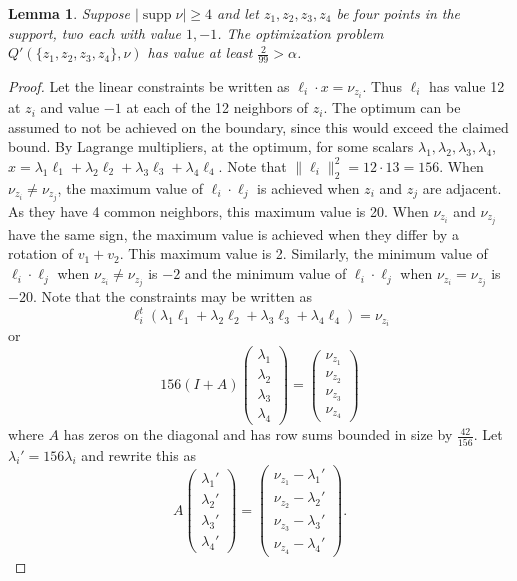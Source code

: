 \documentclass[a4paper, 12pt, notitlepage]{amsart}
\newcommand{\supp}{\operatorname{supp}}
\newtheorem{lemma}[theorem]{Lemma}
\theoremstyle{remark}
\begin{document}
\begin{lemma}
Suppose $|\supp \nu| \geq 4$ and let $z_1, z_2, z_3, z_4$ be four points in the support, two each with value $1, -1$.  The optimization problem $Q'(\{z_1, z_2, z_3, z_4\}, \nu)$ has value at least $\frac{2}{99} > \alpha$.  
 \end{lemma}
 \begin{proof}
Let the linear constraints be written as $\ell_i \cdot x = \nu_{z_i}$. Thus $\ell_i$ has value 12 at $z_i$ and value $-1$ at each of the 12 neighbors of $z_i$.  The optimum can be assumed to  not be achieved on the boundary, since this would exceed the claimed bound. By Lagrange multipliers, at the optimum, for some scalars $\lambda_1, \lambda_2, \lambda_3, \lambda_4$, $x = \lambda_1 \ell_1 + \lambda_2 \ell_2 +\lambda_3 \ell_3 + \lambda_4 \ell_4$.  Note that $\|\ell_i\|_2^2 = 12\cdot 13 = 156$.  When $\nu_{z_i} \neq \nu_{z_j}$, the maximum value of $\ell_i \cdot \ell_j$ is achieved when $z_i$ and $z_j$ are adjacent.  As they have 4 common neighbors, this maximum value is 20.  When $\nu_{z_i}$ and $\nu_{z_j}$ have the same sign, the maximum value is achieved when they differ by a rotation of $v_1 + v_2$. This maximum value is 2. Similarly, the minimum value of $\ell_i \cdot \ell_j$ when $\nu_{z_i} \neq \nu_{z_j}$ is $-2$ and the minimum value of $\ell_i \cdot \ell_j$ when $\nu_{z_i} = \nu_{z_j}$ is $-20$.  Note that the constraints may be written as
\begin{equation}
 \ell_i^t (\lambda_1 \ell_1 + \lambda_2 \ell_2 + \lambda_3 \ell_3 + \lambda_4 \ell_4) = \nu_{z_i}
\end{equation}
or
\begin{equation}
 156(I+A) \begin{pmatrix} \lambda_1\\ \lambda_2\\ \lambda_3\\\lambda_4 \end{pmatrix} = \begin{pmatrix} \nu_{z_1}\\ \nu_{z_2}\\ \nu_{z_3}\\ \nu_{z_4} \end{pmatrix}
\end{equation}
where $A$ has zeros on the diagonal and has row sums bounded in size by $\frac{42}{156}$.  Let $\lambda_i' = 156 \lambda_i $ and rewrite this as
\begin{equation}
 A\begin{pmatrix} \lambda_1'\\ \lambda_2'\\ \lambda_3'\\\lambda_4' \end{pmatrix} = \begin{pmatrix} \nu_{z_1} - \lambda_1'\\ \nu_{z_2} - \lambda_2' \\ \nu_{z_3} - \lambda_3' \\ \nu_{z_4} -\lambda_4'\end{pmatrix}.

\end{equation}
\end{proof}
\end{document}
